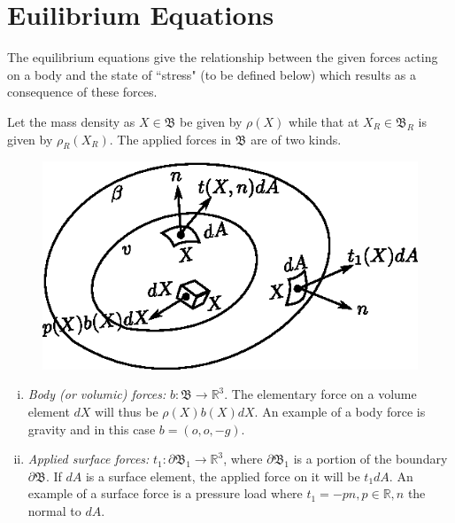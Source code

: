 \section{Euilibrium Equations}\label{chap1-sec1.2}
\setcounter{figure}{0} 

The equilibrium equations give the relationship between the given
forces acting on a body and the state of ``stress" (to be defined
below) which results as a consequence of these forces. 
 
Let the mass density as $X \in \mathfrak{B}$ be given by $\rho(X)$
while that at $X_R \in \mathfrak{B}_R$ is given by $\rho_R (X_R)$. The
applied forces in $\mathfrak{B}$ are of two kinds. 


\begin{figure}[H]
\centering
\includegraphics{vol71-figures/fig1.2-1.eps}
\medskip
\caption{}\label{fig1.2.1}
\end{figure}\pageoriginale 

\begin{enumerate}[(i)]
\item \textit{Body ({\em or} volumic) forces:} $b: \mathfrak{B} \to
  \mathbb{R}^3$. The elementary force on a volume element $dX$ will
  thus be $\rho(X) b(X) dX$. An example of a body force is gravity 
  and in this case $b = (o, o, -g)$. 

\item \textit{Applied surface forces:}
  $t_1 : \partial \mathfrak{B}_1 
  \rightarrow \mathbb{R}^3$, where $\partial \mathfrak{B}_1$ is a
  portion of the boundary $\partial \mathfrak{B}$. If $dA$ is a
  surface element, the applied force on it will be $t_1 dA$. An
  example of a surface force is a pressure load where $t_1 = -pn, p
  \in \mathbb{R}, n$ the normal to $dA$. 
\end{enumerate} 

